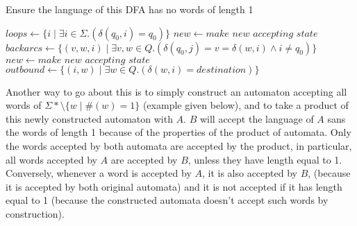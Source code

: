 \documentclass[11pt]{article}
\begin{document}
\begin{algorithm}
  \caption{Ensure the language of this DFA has no words of length 1}
  \begin{algorithmic}
      \State $loops \gets \{i \;|\; \exists i \in \Sigma. (\delta(q_0, i) = q_0)\}$
      \State $new \gets \textit{make new accepting state}$
      \State $backarcs \gets \{(v, w, i) \;|\; 
      \exists v,w \in Q. (\delta(q_0, j) = v = \delta(w, i) \land i \neq q_0)\}$
        \State {}
        \State {}
        \State {}
        \State {}
      \EndFor
        \State {}
        \State {}
      \EndFor
        \State {}
        \State $new \gets \textit{make new accepting state}$
        \State {}
        \State {}
        \State $outbound \gets \{(i, w) \;|\; \exists w \in Q. (\delta(w, i) = destination)\}$
          \State {}
          \State {}
        \EndFor
      \EndFor
    \EndProcedure
  \end{algorithmic}
\end{algorithm}

Another way to go about this is to simply construct an automaton accepting
all words of \(\Sigma* \setminus \{w \;|\; \#(w) = 1\}\) (example given
below), and to take a product of this newly constructed automaton with \(A\).
\(B\) will accept the language of \(A\) sans the words of length 1 because of
the properties of the product of automata.  Only the words accepted by both
automata are accepted by the product, in particular, all words accepted by
\(A\) are accepted by \(B\), unless they have length equal to 1.  Conversely,
whenever a word is accepted by \(A\), it is also accepted by \(B\), (because it
is accepted by both original automata) and it is not accepted if it has
length equal to 1 (because the constructed automata doesn't accept such words
by construction).
\end{document}
